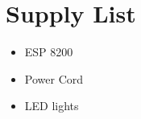 \section{Supply List}


\begin{itemize}
    \item ESP 8200
    \item Power Cord
    \item LED lights
\end{itemize}